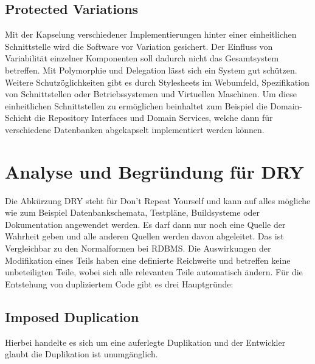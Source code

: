 \subsection{Protected Variations}
Mit der Kapselung verschiedener Implementierungen hinter einer einheitlichen Schnittstelle wird die Software vor Variation gesichert.
Der Einfluss von Variabilität einzelner Komponenten soll dadurch nicht das Gesamtsystem betreffen.
Mit Polymorphie und Delegation lässt sich ein System gut schützen.
Weitere Schutzöglichkeiten gibt es durch Stylesheets im Webumfeld, Spezifikation von Schnittstellen oder Betriebssystemen und Virtuellen Maschinen.
Um diese einheitlichen Schnittstellen zu ermöglichen beinhaltet zum Beispiel die Domain-Schicht die Repository Interfaces und Domain Services,
welche dann für verschiedene Datenbanken abgekapselt implementiert werden können.
\newpage
\section{Analyse und Begründung für DRY}
Die Abkürzung DRY steht für Don’t Repeat Yourself und kann auf alles mögliche wie zum Beispiel Datenbankschemata, Testpläne, Buildsysteme oder Dokumentation angewendet werden.
Es darf dann nur noch eine Quelle der Wahrheit geben und alle anderen Quellen werden davon abgeleitet.
Das ist Vergleichbar zu den Normalformen bei RDBMS.
Die Auswirkungen der Modifikation eines Teils haben eine definierte Reichweite und betreffen keine unbeteiligten Teile,
wobei sich alle relevanten Teile automatisch ändern.
Für die Entstehung von dupliziertem Code gibt es drei Hauptgründe:
\subsection{Imposed Duplication}
Hierbei handelte es sich um eine auferlegte Duplikation und der Entwickler glaubt die Duplikation ist unumgänglich.
